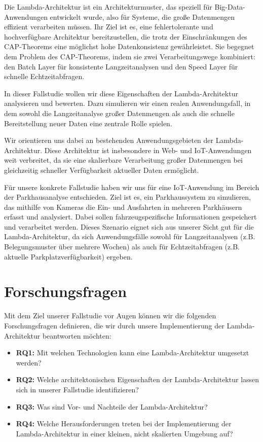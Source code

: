 Die Lambda-Architektur ist ein Architekturmuster, das speziell für Big-Data-Anwendungen entwickelt wurde, also für Systeme, die große Datenmengen effizient verarbeiten müssen. Ihr Ziel ist es, eine fehlertolerante und hochverfügbare Architektur bereitzustellen, die trotz der Einschränkungen des CAP-Theorems eine möglichst hohe Datenkonsistenz gewährleistet. Sie begegnet dem Problem des CAP-Theorems, indem sie zwei Verarbeitungswege kombiniert: den Batch Layer für konsistente Langzeitanalysen und den Speed Layer für schnelle Echtzeitabfragen.

In dieser Fallstudie wollen wir diese Eigenschaften der Lambda-Architektur analysieren und bewerten. Dazu simulieren wir einen realen Anwendungsfall, in dem sowohl die Langzeitanalyse großer Datenmengen als auch die schnelle Bereitstellung neuer Daten eine zentrale Rolle spielen.

Wir orientieren uns dabei an bestehenden Anwendungsgebieten der Lambda-Architektur. Diese Architektur ist insbesondere in Web- und IoT-Anwendungen weit verbreitet, da sie eine skalierbare Verarbeitung großer Datenmengen bei gleichzeitig schneller Verfügbarkeit aktueller Daten ermöglicht.

Für unsere konkrete Fallstudie haben wir uns für eine IoT-Anwendung im Bereich der Parkhausanalyse entschieden.
Ziel ist es, ein Parkhaussystem zu simulieren, das mithilfe von Kameras die Ein- und Ausfahrten in mehreren Parkhäusern erfasst und analysiert.
Dabei sollen fahrzeugspezifische Informationen gespeichert und verarbeitet werden. 
Dieses Szenario eignet sich aus unserer Sicht gut für die Lambda-Architektur, da sich Anwendungsfälle sowohl für Langzeitanalysen (z.B. Belegungsmuster über mehrere Wochen) als auch für Echtzeitabfragen (z.B. aktuelle Parkplatzverfügbarkeit) ergeben.


\section{Forschungsfragen}
Mit dem Ziel unserer Fallstudie vor Augen können wir die folgenden Forschungsfragen definieren, die wir durch unsere Implementierung der Lambda-Architektur beantworten möchten:
\begin{itemize}
	\item \textbf{RQ1:} Mit welchen Technologien kann eine Lambda-Architektur umgesetzt werden?
	\item \textbf{RQ2:} Welche architektonischen Eigenschaften der Lambda-Architektur lassen sich in unserer Fallstudie identifizieren?
	\item \textbf{RQ3:} Was sind Vor- und Nachteile der Lambda-Architektur?
	\item \textbf{RQ4:} Welche Herausforderungen treten bei der Implementierung der Lambda-Architektur in einer kleinen, nicht skalierten Umgebung auf?
\end{itemize}


